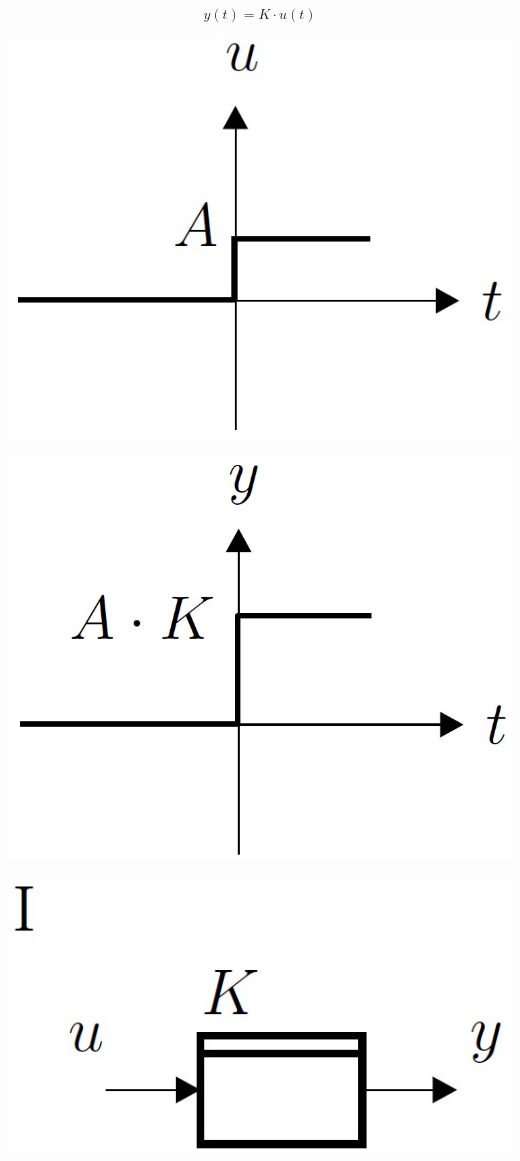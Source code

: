 $$ \boxed{ y(t) = K \cdot u(t) } $$

\begin{minipage}{0.23\columnwidth}
    \includegraphics[width=0.8\columnwidth]{images/eingangssignal_schrittantwort} 
\end{minipage}
\hfill
\begin{minipage}{0.23\columnwidth}
    \includegraphics[width=0.8\columnwidth]{images/schrittantwort_p-glied} 
\end{minipage}
\hfill
\begin{minipage}{0.23\columnwidth}
    \includegraphics[width=0.8\columnwidth]{images/symbol_p-glied_1}
\end{minipage}
